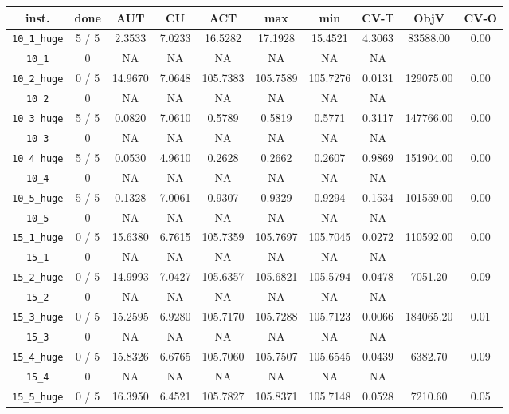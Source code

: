 \documentclass{scrartcl}
\begin{document}
\begin{table}[h!]
\begin{center}
\small
\begin{tabular}{| c | c | c | c | c | c | c | c | c | c |}
\hline
inst. & done & AUT & CU & ACT & max & min & CV-T & ObjV & CV-O \\
\hline
\verb|10_1_huge| & 5 / 5 & 2.3533 & 7.0233 & 16.5282 & 17.1928 & 15.4521 & 4.3063 & 83588.00 & 0.00\\ 
\verb|10_1| & 0 & NA & NA & NA & NA & NA & NA & \\ 
\verb|10_2_huge| & 0 / 5 & 14.9670 & 7.0648 & 105.7383 & 105.7589 & 105.7276 & 0.0131 & 129075.00 & 0.00\\ 
\verb|10_2| & 0 & NA & NA & NA & NA & NA & NA & \\ 
\verb|10_3_huge| & 5 / 5 & 0.0820 & 7.0610 & 0.5789 & 0.5819 & 0.5771 & 0.3117 & 147766.00 & 0.00\\ 
\verb|10_3| & 0 & NA & NA & NA & NA & NA & NA & \\ 
\verb|10_4_huge| & 5 / 5 & 0.0530 & 4.9610 & 0.2628 & 0.2662 & 0.2607 & 0.9869 & 151904.00 & 0.00\\ 
\verb|10_4| & 0 & NA & NA & NA & NA & NA & NA & \\ 
\verb|10_5_huge| & 5 / 5 & 0.1328 & 7.0061 & 0.9307 & 0.9329 & 0.9294 & 0.1534 & 101559.00 & 0.00\\ 
\verb|10_5| & 0 & NA & NA & NA & NA & NA & NA & \\ 
\verb|15_1_huge| & 0 / 5 & 15.6380 & 6.7615 & 105.7359 & 105.7697 & 105.7045 & 0.0272 & 110592.00 & 0.00\\ 
\verb|15_1| & 0 & NA & NA & NA & NA & NA & NA & \\ 
\verb|15_2_huge| & 0 / 5 & 14.9993 & 7.0427 & 105.6357 & 105.6821 & 105.5794 & 0.0478 & 7051.20 & 0.09\\ 
\verb|15_2| & 0 & NA & NA & NA & NA & NA & NA & \\ 
\verb|15_3_huge| & 0 / 5 & 15.2595 & 6.9280 & 105.7170 & 105.7288 & 105.7123 & 0.0066 & 184065.20 & 0.01\\ 
\verb|15_3| & 0 & NA & NA & NA & NA & NA & NA & \\ 
\verb|15_4_huge| & 0 / 5 & 15.8326 & 6.6765 & 105.7060 & 105.7507 & 105.6545 & 0.0439 & 6382.70 & 0.09\\ 
\verb|15_4| & 0 & NA & NA & NA & NA & NA & NA & \\ 
\verb|15_5_huge| & 0 / 5 & 16.3950 & 6.4521 & 105.7827 & 105.8371 & 105.7148 & 0.0528 & 7210.60 & 0.05\\ 

\end{tabular}
\end{center}
\end{table}
\end{document}
